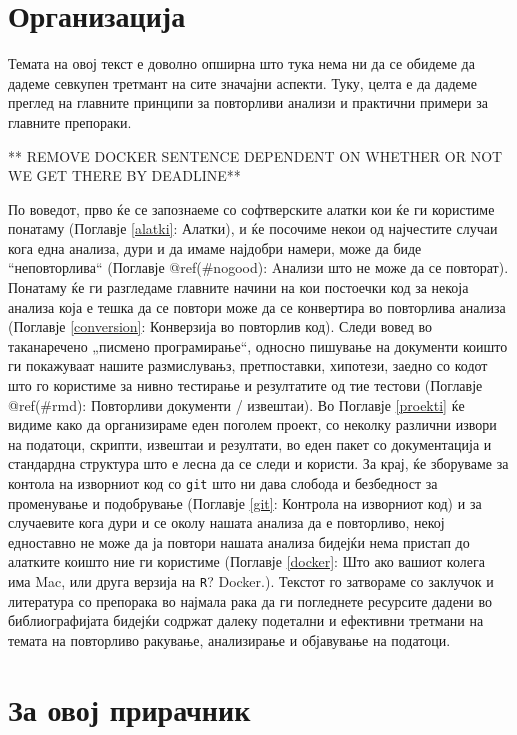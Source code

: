 \documentclass[
]{book}
\begin{document}
\hypertarget{organ}{%
\section{Организација}\label{organ}}

Темата на овој текст е доволно опширна што тука нема ни да се обидеме да дадеме севкупен третмант на сите значајни аспекти. Туку, целта е да дадеме преглед на главните принципи за повторливи анализи и практични примери за главните препораки.

** REMOVE DOCKER SENTENCE DEPENDENT ON WHETHER OR NOT WE GET THERE BY DEADLINE**

По воведот, прво ќе се запознаеме со софтверските алатки кои ќе ги користиме понатаму (Поглавје \ref{alatki}: Алатки), и ќе посочиме некои од најчестите случаи кога една анализа, дури и да имаме најдобри намери, може да биде ``неповторлива`` (Поглавје @ref(\#nogood): Aнализи што не може да се повторат). Понатаму ќе ги разгледаме главните начини на кои постоечки код за некоја анализа која е тешка да се повтори може да се конвертира во повторлива анализа (Поглавје \ref{conversion}: Конверзија во повторлив код). Следи вовед во таканаречено „писмено програмирање``, односно пишување на документи коишто ги покажуваат нашите размислувањз, претпоставки, хипотези, заедно со кодот што го користиме за нивно тестирање и резултатите од тие тестови (Поглавје @ref(\#rmd): Повторливи документи / извештаи). Во Поглавје \ref{proekti} ќе видиме како да организираме еден поголем проект, со неколку различни извори на податоци, скрипти, извештаи и резултати, во еден пакет со документација и стандардна структура што е лесна да се следи и користи. За крај, ќе зборуваме за контола на изворниот код со \texttt{git} што ни дава слобода и безбедност за променување и подобрување (Поглавје \ref{git}: Контрола на изворниот код) и за случаевите кога дури и се околу нашата анализа да е повторливо, некој едноставно не може да ја повтори нашата анализа бидејќи нема пристап до алатките коишто ние ги користиме (Поглавје \ref{docker}: Што ако вашиот колега има Mac, или друга верзија на \texttt{R}? Docker.). Текстот го затвораме со заклучок и литература со препорака во најмала рака да ги погледнете ресурсите дадени во библиографијата бидејќи содржат далеку подетални и ефективни третмани на темата на повторливо ракување, анализирање и објавување на податоци.

\hypertarget{ux437ux430-ux43eux432ux43eux458-ux43fux440ux438ux440ux430ux447ux43dux438ux43a}{%
\section{За овој прирачник}\label{ux437ux430-ux43eux432ux43eux458-ux43fux440ux438ux440ux430ux447ux43dux438ux43a}}
\end{document}
